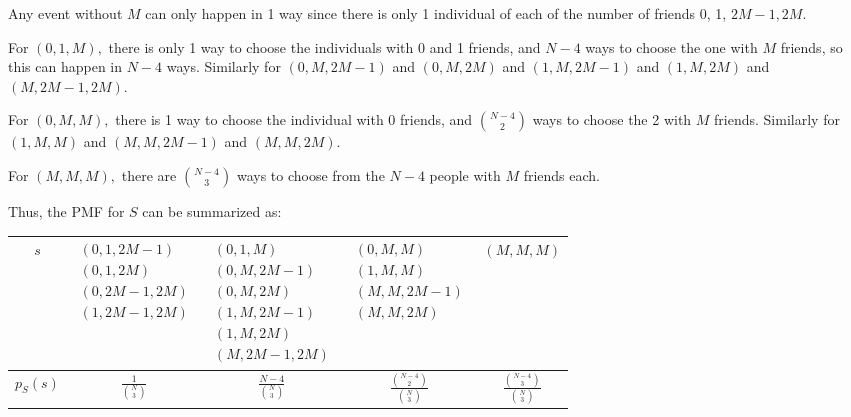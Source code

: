 \documentclass{article}
\begin{document}
\begin{enumerate}
\begin{enumerate}[(a)]
\begin{soln}
					Any event without $M$ can only happen in 1 way since there is only 1 individual of each of the number of friends 0, 1, $2M-1, 2M.$ 

					For $(0, 1, M),$ there is only 1 way to choose the individuals with 0 and 1 friends, and $N-4$ ways to choose the one with $M$ friends, so this can happen in $N-4$ ways. Similarly for $(0, M, 2M-1)$ and $(0, M, 2M)$ and $(1, M, 2M-1)$ and $(1, M, 2M)$ and $(M, 2M-1, 2M).$

					For $(0, M, M),$ there is 1 way to choose the individual with 0 friends, and $\binom{N-4}{2}$ ways to choose the 2 with $M$ friends. Similarly for $(1, M, M)$ and $(M, M, 2M-1)$ and $(M, M, 2M).$ 

					For $(M, M, M),$ there are $\binom{N-4}{3}$ ways to choose from the $N-4$ people with $M$ friends each. 

					Thus, the PMF for $S$ can be summarized as:
					\begin{center}
						\begin{tabular}{c||c|c|c|c}
							$s$ & $\begin{matrix}
								(0, 1, 2M-1) \\
								(0, 1, 2M) \\
								(0, 2M-1, 2M) \\
								(1, 2M-1, 2M)
							\end{matrix}$ & $\begin{matrix}
								(0, 1, M) \\
								(0, M, 2M-1) \\
								(0, M, 2M) \\
								(1, M, 2M-1) \\
								(1, M, 2M) \\
								(M, 2M-1, 2M)
							\end{matrix}$ & $\begin{matrix}
								(0, M, M) \\
								(1, M, M) \\
								(M, M, 2M-1) \\
								(M, M, 2M)
							\end{matrix}$ & $(M, M, M)$ \\
							\hline
							$p_S(s)$ & $\displaystyle\frac{1}{\binom{N}{3}}$ & $\displaystyle\frac{N-4}{\binom{N}{3}}$ & $\displaystyle\frac{\binom{N-4}{2}}{\binom{N}{3}}$ & $\displaystyle\frac{\binom{N-4}{3}}{\binom{N}{3}}$
						\end{tabular}
					\end{center}


\end{soln}
\end{enumerate}
\end{enumerate}
\end{document}

